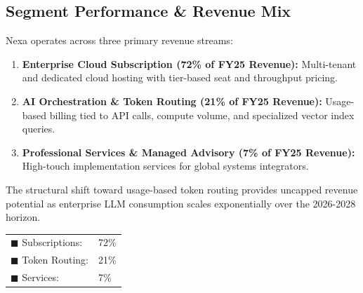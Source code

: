\documentclass[10pt,a4paper]{scrartcl}
\begin{document}
\vspace{10pt}

\textcolor{NavyPrimary}{\subsection*{Segment Performance \& Revenue Mix}}

\begin{minipage}[t]{0.56\textwidth}
    \vspace{0pt}
    \small
    Nexa operates across three primary revenue streams:
    \begin{enumerate}[leftmargin=14pt, itemsep=4pt]
        \item \textbf{Enterprise Cloud Subscription (72\% of FY25 Revenue):} Multi-tenant and dedicated cloud hosting with tier-based seat and throughput pricing.
        \item \textbf{AI Orchestration \& Token Routing (21\% of FY25 Revenue):} Usage-based billing tied to API calls, compute volume, and specialized vector index queries.
        \item \textbf{Professional Services \& Managed Advisory (7\% of FY25 Revenue):} High-touch implementation services for global systems integrators.
    \end{enumerate}
    
    The structural shift toward usage-based token routing provides uncapped revenue potential as enterprise LLM consumption scales exponentially over the 2026-2028 horizon.
\end{minipage}%
\hfill
\begin{minipage}[t]{0.40\textwidth}
    \vspace{0pt}
    \begin{tcolorbox}[calloutbox, title=\textcolor{NavyPrimary}{Revenue Contribution (FY25)}, colframe=BorderGray, colbacktitle=LightBlueBg, coltitle=NavyPrimary]
        \centering
        
        \vspace{4pt}
        \scriptsize
        \begin{tabular}{@{}ll@{}}
            \textcolor{NavyPrimary}{$\blacksquare$} Subscriptions: & 72\% \\
            \textcolor{BlueAccent}{$\blacksquare$} Token Routing: & 21\% \\
            \textcolor{TextMuted}{$\blacksquare$} Services: & 7\%
        \end{tabular}
    \end{tcolorbox}
\end{minipage}
\end{document}
